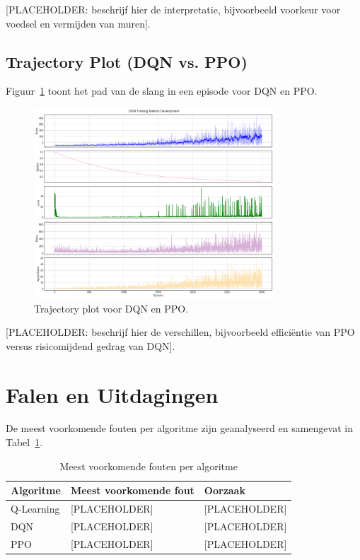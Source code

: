 \documentclass[a4paper,10pt]{report}
\begin{document}
[PLACEHOLDER: beschrijf hier de interpretatie, bijvoorbeeld voorkeur voor voedsel en vermijden van muren].

\subsection{Trajectory Plot (DQN vs. PPO)}
Figuur~\ref{fig:trajectory} toont het pad van de slang in een episode voor DQN
en PPO.

\begin{figure}[ht]
    \centering
    \includegraphics[width=0.8\textwidth]{../Experimenten/Snake/DQN/dqn_analysis.png}
    \caption{Trajectory plot voor DQN en PPO.}
    \label{fig:trajectory}
\end{figure}

[PLACEHOLDER: beschrijf hier de verschillen, bijvoorbeeld efficiëntie van PPO versus risicomijdend gedrag van DQN].

\section{Falen en Uitdagingen}
De meest voorkomende fouten per algoritme zijn geanalyseerd en samengevat in
Tabel~\ref{tab:fouten}.

\begin{table}[ht]
    \centering
    \caption{Meest voorkomende fouten per algoritme}
    \label{tab:fouten}
    \begin{tabular}{|l|l|l|}
        \hline
        \textbf{Algoritme} & \textbf{Meest voorkomende fout} & \textbf{Oorzaak} \\ \hline
        Q-Learning         & [PLACEHOLDER]                   & [PLACEHOLDER]    \\ \hline
        DQN                & [PLACEHOLDER]                   & [PLACEHOLDER]    \\ \hline
        PPO                & [PLACEHOLDER]                   & [PLACEHOLDER]    \\ \hline
    \end{tabular}
\end{table}
\end{document}
